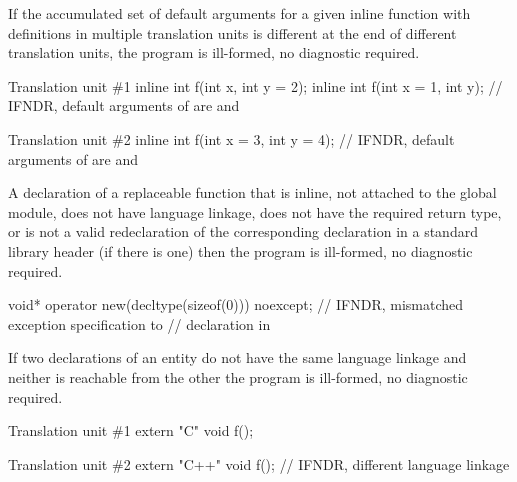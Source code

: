 
\pnum
If the accumulated set of default arguments
for a given inline function
with definitions in multiple translation units
is different at the end
of different translation units,
the program is ill-formed, no diagnostic required.

\pnum
\begin{example}
\begin{codeblocktu}{Translation unit \#1}
inline int f(int x,     int y = 2);
inline int f(int x = 1, int y);
  // IFNDR, default arguments of  are  and 
\end{codeblocktu}
\begin{codeblocktu}{Translation unit \#2}
inline int f(int x = 3, int y = 4);
  // IFNDR, default arguments of  are  and 
\end{codeblocktu}
\end{example}


\pnum
A declaration of a replaceable function
that is inline,
not attached to the global module,
does not have \Cpp{} language linkage,
does not have the required return type,
or is not a valid redeclaration of the
corresponding declaration in a standard library header (if there is one)
then the program is ill-formed, no diagnostic required.

\pnum
\begin{example}
\begin{codeblock}
void* operator new(decltype(sizeof(0))) noexcept;   // IFNDR, mismatched exception specification to
                                                    // declaration in 
\end{codeblock}
\end{example}


\pnum
If two declarations of an entity
do not have the same language linkage
and neither is reachable from the other
the program is ill-formed, no diagnostic required.

\pnum
\begin{example}
\begin{codeblocktu}{Translation unit \#1}
extern "C" { void f(); }
\end{codeblocktu}
\begin{codeblocktu}{Translation unit \#2}
extern "C++" { void f(); }  // IFNDR, different language linkage
\end{codeblocktu}
\end{example}

